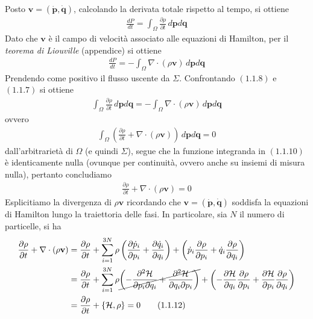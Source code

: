\documentclass{article}
\begin{document}
Posto $\mathbf{v} = (\dot{\mathbf{p}}, \dot{\mathbf{q}})$, calcolando la derivata totale rispetto al tempo, si ottiene
\begin{gather}
    \frac{dP}{dt} = \int_{\Omega}\frac{\partial \rho}{\partial t} \, d\mathbf{p}d\mathbf{q} \tag{1.1.7}
\end{gather}
Dato che $\mathbf{v}$ è il campo di velocità associato alle equazioni di Hamilton, per il \textit{teorema di Liouville} (appendice) si ottiene
\begin{align}
    \frac{dP}{dt} = -\int_{\Omega}\nabla \cdot (\rho\mathbf{v}) \, d\mathbf{p}d\mathbf{q} \tag{1.1.8}
\end{align}
Prendendo come positivo il flusso uscente da $\Sigma$. Confrontando $(1.1.8)$ e $(1.1.7)$ si ottiene
\begin{gather}
    \int_\Omega \frac{\partial \rho}{\partial t} \, d\mathbf{p}d\mathbf{q} = -\int_{\Omega}\nabla \cdot (\rho\mathbf{v}) \, d\mathbf{p}d\mathbf{q} \tag{1.1.9}
\end{gather}
ovvero
\begin{gather}
    \int_\Omega \left(\frac{\partial \rho}{\partial t} + \nabla \cdot (\rho\mathbf{v})\right) \, d\mathbf{p}d\mathbf{q} = 0 \tag{1.1.10}
\end{gather}
dall'arbitrarietà di $\Omega$ (e quindi $\Sigma$), segue che la funzione integranda in $(1.1.10)$ è identicamente nulla (ovunque per continuità, ovvero anche su insiemi di misura nulla), pertanto concludiamo
\begin{gather}
    \frac{\partial \rho}{\partial t} + \nabla \cdot (\rho\mathbf{v}) = 0 \tag{1.1.11}
\end{gather}
Esplicitiamo la divergenza di $\rho\mathbf{v}$ ricordando che $\mathbf{v} = (\dot{\mathbf{p}}, \dot{\mathbf{q}})$ soddisfa la equazioni di Hamilton lungo la traiettoria delle fasi. In particolare, sia $N$ il numero di particelle, si ha
\begin{align}
    \frac{\partial \rho}{\partial t} + \nabla\cdot(\rho\mathbf{v}) &= \frac{\partial \rho}{\partial t} + \sum_{i = 1}^{3N}\rho\left(\frac{\partial\dot{p}_i}{\partial p_i} + \frac{\partial\dot{q}_i}{\partial q_i}\right) + \left(\dot{p}_i\frac{\partial\rho}{\partial p_i} + \dot{q}_i\frac{\partial\rho}{\partial q_i}\right) \notag \\
    &= \frac{\partial \rho}{\partial t} + \sum_{i = 1}^{3N}\rho\cancel{\left(-\frac{\partial^2\mathcal{H}}{\partial p_i \partial q_i} + \frac{\partial^2\mathcal{H}}{\partial q_i\partial p_i}\right)} + \left(-\frac{\partial\mathcal{H}}{\partial q_i}\frac{\partial\rho}{\partial p_i} + \frac{\partial \mathcal{H}}{\partial p_i}\frac{\partial\rho}{\partial q_i}\right) \notag \\
    &= \frac{\partial \rho}{\partial t} + \{\mathcal{H}, \rho\} = 0 \tag{1.1.12}
\end{align}
\end{document}
